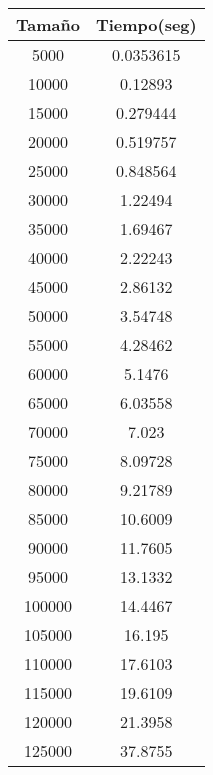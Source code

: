 \begin{tabular}{|c|c|}
\hline
\textbf{Tamaño} & \textbf{Tiempo(seg)} \\ \hline
5000   & 0.0353615   \\ \hline
10000  & 0.12893     \\ \hline
15000  & 0.279444    \\ \hline
20000  & 0.519757    \\ \hline
25000  & 0.848564    \\ \hline
30000  & 1.22494     \\ \hline
35000  & 1.69467     \\ \hline
40000  & 2.22243     \\ \hline
45000  & 2.86132     \\ \hline
50000  & 3.54748     \\ \hline
55000  & 4.28462     \\ \hline
60000  & 5.1476      \\ \hline
65000  & 6.03558     \\ \hline
70000  & 7.023       \\ \hline
75000  & 8.09728     \\ \hline
80000  & 9.21789     \\ \hline
85000  & 10.6009     \\ \hline
90000  & 11.7605     \\ \hline
95000  & 13.1332     \\ \hline
100000 & 14.4467     \\ \hline
105000 & 16.195      \\ \hline
110000 & 17.6103     \\ \hline
115000 & 19.6109     \\ \hline
120000 & 21.3958     \\ \hline
125000 & 37.8755     \\ \hline
\end{tabular}
